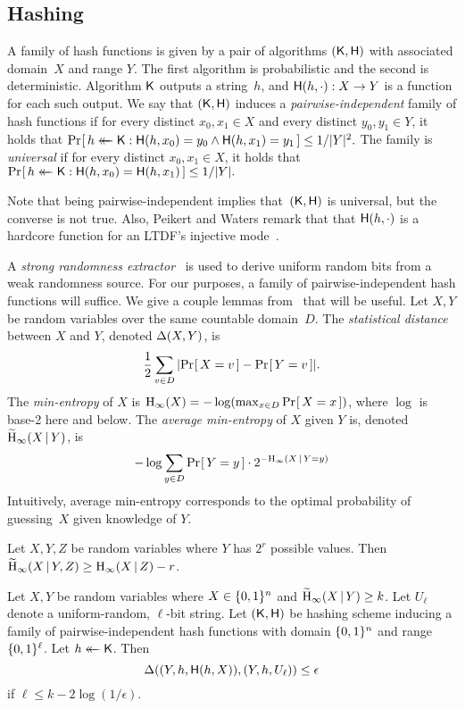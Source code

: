 \subsection{Hashing}
\label{sec-extractors}

A family of hash functions is given by a pair of algorithms $(\mathsf{K}, \mathsf{H})$
with associated domain~$X$ and range $Y$.
%
The first algorithm is probabilistic and the second is deterministic.
%
Algorithm $\mathsf{K}$ outputs a string~$h$, and $\mathsf{H}(h, \cdot) : X \to
Y$ is a function for each such output.
%
We say that $(\mathsf{K}, \mathsf{H})$ induces a \emph{pairwise-independent} family of
hash functions if for every distinct $x_0,x_1 \in X$ and every distinct $y_0,
y_1 \in Y$, it holds that $ {\Pr\hspace{-1pt}\left[\,{ h \mathrel{\leftarrow\mkern-14mu\leftarrow} \mathsf{K} : \mathsf{H}(h,x_0) =
y_0 \wedge \mathsf{H}(h,x_1) = y_1 }\,\right]} \leq {1}/{|Y|^2}.$
%
The family is \emph{universal} if for every distinct $x_0,x_1 \in X$, it holds
that $ {\Pr\hspace{-1pt}\left[\,{ h \mathrel{\leftarrow\mkern-14mu\leftarrow} \mathsf{K} : \mathsf{H}(h, x_0) = \mathsf{H}(h, x_1) }\,\right]}
\leq {1}/{|Y|}.  $

Note that being pairwise-independent implies that~$(\mathsf{K}, \mathsf{H})$ is
universal, but the converse is not true.
%
Also, Peikert and Waters remark that that $\mathsf{H}(h,\cdot)$ is a hardcore
function for an LTDF's injective mode~\cite{pw08}.

A \emph{strong randomness extractor}~\cite{shaltiel02} is used to derive uniform
random bits from a weak randomness source. For our purposes, a family of
pairwise-independent hash functions will suffice. We give a couple lemmas
from~\cite{drs04} that will be useful.
%
Let $X,Y$ be random variables over the same countable domain~$D$.
%
The \emph{statistical distance} between $X$ and $Y$, denoted $\mathrm{\Delta}(X,Y)$,
is
\[
  \frac{1}{2} \sum_{v\in D} | {\Pr\hspace{-1pt}\left[\,{X=v}\,\right]} - {\Pr\hspace{-1pt}\left[\,{Y=v}\,\right]}|.
\]
%
The \emph{min-entropy} of $X$ is $\mathrm{H}_\infty(X) = -\log(\max_{x\in D}
{\Pr\hspace{-1pt}\left[\,{X=x}\,\right]})$, where $\log$ is base-2 here and below.
%
The \emph{average min-entropy} of $X$ given $Y$ is, denoted $\widetilde{\mathrm{H}}_\infty(X
\,|\, Y)$, is
\[
  - \log \sum_{y\in D} {\Pr\hspace{-1pt}\left[\,{Y = y}\,\right]} \cdot 2^{-\mathrm{H}_\infty(X \,|\, Y=y)}
\]
%
Intuitively, average min-entropy corresponds to the optimal probability of
guessing~$X$ given knowledge of $Y$.

\begin{lemma}\label{lemma1}
  Let $X,Y,Z$ be random variables where $Y$ has $2^r$ possible values.
  Then $\widetilde{\mathrm{H}}_\infty(X \,|\, Y,Z) \ge \mathrm{H}_\infty(X \,|\, Z) - r$.
\end{lemma}

\begin{lemma}\label{lemma2}
  Let $X,Y$ be random variables where $X \in \{0,1\}^n$ and $\widetilde{\mathrm{H}}_\infty(X
  \,|\, Y) \ge k$.
  Let $U_\ell$ denote a uniform-random, $\ell$-bit string.
  Let $(\mathsf{K}, \mathsf{H})$ be hashing scheme inducing a family of
  pairwise-independent hash functions with domain $\{0,1\}^n$ and range
  $\{0,1\}^\ell$. Let $h \mathrel{\leftarrow\mkern-14mu\leftarrow} \mathsf{K}$. Then
  \[
    \mathrm{\Delta}((Y, h, \mathsf{H}(h, X)), (Y, h, U_\ell)) \le \epsilon
  \]
  if $\ell \leq k - 2 \log(1/\epsilon)$.
\end{lemma}


